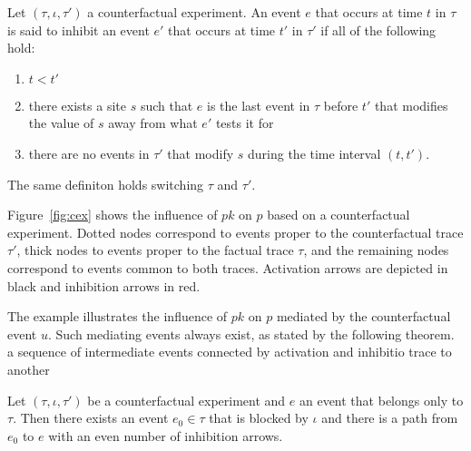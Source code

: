 \begin{definition}
  Let $(\tau, \iota, \tau')$ a counterfactual experiment. An
  event $e$ that occurs at time $t$ in $\tau$ is said to inhibit an
  event $e'$ that occurs at time $t'$ in $\tau'$ if all of the
  following hold:
  \begin{enumerate}[leftmargin=1.2cm, label=\textbf{IC\arabic*.}]
  \item \label{inhibition:time} $t < t'$
  \item \label{inhibition:breaks} there exists a site $s$ such that
    $e$ is the last event in $\tau$ before $t'$ that modifies the
    value of $s$ away from what $e'$ tests it for
  \item \label{inhibition:nointf} there are no events in $\tau'$ that
    modify $s$ during the time interval $(t, t')$.
  \end{enumerate}
  The same definiton holds switching $\tau$ and $\tau'$.
\end{definition}





Figure~\ref{fig:cex} shows the influence of $pk$ on $p$ based on a
counterfactual experiment. Dotted nodes correspond to events proper to
the counterfactual trace $\tau'$, thick nodes to events proper to the
factual trace $\tau$, and the remaining nodes correspond to events
common to both traces. Activation arrows are depicted in black and
inhibition arrows in red.

The example illustrates the influence of $pk$ on $p$ mediated by the
counterfactual event $u$. Such mediating events always exist, as
stated by the following theorem.  %
a sequence of intermediate events connected by activation and
inhibitio%
trace to another %

\begin{theorem}\label{thm:completeness} Let $(\tau, \iota, \tau')$ be a counterfactual
  experiment and $e$ an event that belongs only to $\tau$. Then there
  exists an event $e_0 \in \tau$ that is blocked by $\iota$ and there
  is a path from $e_0$ to $e$ with an even number of inhibition
  arrows.
\end{theorem}